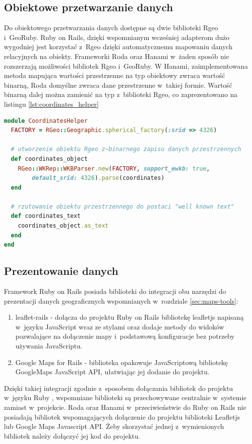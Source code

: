 \documentclass[printmode]{mgr}
\begin{document}
\subsection{Obiektowe przetwarzanie danych}

 Do obiektowego przetwarzania danych dostępne są dwie biblioteki Rgeo i~GeoRuby. Ruby on Rails, dzięki wspomnianym wcześniej adapterom dużo wygodniej jest korzystać z~Rgeo dzięki automatycznemu mapowaniu danych relacyjnych na obiekty.
 Frameworki Roda oraz Hanami w~żaden sposób nie rozszerzają możliwości bibliotek Rgeo i~GeoRuby. W  Hanami, zaimplementowana metoda mapująca wartości przestrzenne na typ obiektowy zwraca wartość binarną, Roda domyślne zwraca dane przestrzenne w~takiej formie. Wartość binarną dalej można zamienić na typ z~biblioteki Rgeo, co zaprezentowano na listingu \ref{lst:coordinates_helper}

 \begin{lstlisting}[language=Ruby, caption={Tworzenie obiektu Rgeo z~zapisu binarnego danych przestrzennych}, label=lst:coordinates_helper]
module CoordinatesHelper
  FACTORY = RGeo::Geographic.spherical_factory(:srid => 4326)

  # utworzenie obiektu Rgeo z~binarnego zapisu danych przestrzennych
  def coordinates_object
    RGeo::WKRep::WKBParser.new(FACTORY, support_ewkb: true,
        default_srid: 4326).parse(coordinates)
  end

  # rzutowanie obiektu przestrzennego do postaci "well known text"
  def coordinates_text
    coordinates_object.as_text
  end
end
\end{lstlisting}

\subsection{Prezentowanie danych}

Framework Ruby on Rails posiada biblioteki do integracji obu narzędzi do prezentacji danych geograficznych wspomnianych w~rozdziale \ref{sec:maps-tools}:
\begin{enumerate}
  \item{leaflet-rails} - dołącza do projektu Ruby on Rails bibliotekę leafletjs napisaną w~języku JavaScript wraz ze stylami oraz dodaje metody do widoków pozwalające na dołączenie mapy i~podstawową konfiguracje bez potrzeby używania JavaScriptu.
  \item{Google Maps for Rails} - biblioteka opakowuje JavaScriptową bibliotekę GoogleMaps JavaScript API, ułatwiając jej dodanie do projektu.
\end{enumerate}
Dzięki takiej integracji zgodnie z~sposobem dołączania bibliotek do projektu w~języku Ruby \cite{doc_ruby}, wspomniane biblioteki są przechowywane centralnie w~systemie zamiast w~projekcie.
Roda oraz Hanami w~przeciwieństwie do Ruby on Rails nie posiadają bibliotek wspomagających dołączenie do projektu biblioteki Leafletjs lub Google Maps Javascript API. Żeby skorzystać jednej z~wymienionych bibliotek należy dołączyć jej kod do projektu.
\end{document}
